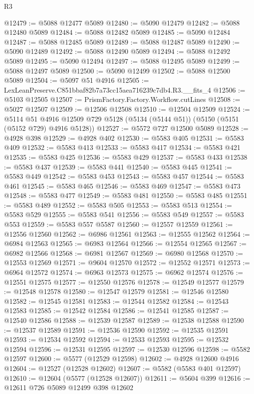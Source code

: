\begin{lexlean}{R3}
\begin{coremodule}
@12479 := @5088 @12477 @5089
@12480 := @5090 @12479
@12482 := @5088 @12480 @5089
@12484 := @5088 @12482 @5089
@12485 := @5090 @12484
@12487 := @5088 @12485 @5089
@12489 := @5088 @12487 @5089
@12490 := @5090 @12489
@12492 := @5088 @12490 @5089
@12494 := @5088 @12492 @5089
@12495 := @5090 @12494
@12497 := @5088 @12495 @5089
@12499 := @5088 @12497 @5089
@12500 := @5090 @12499
@12502 := @5088 @12500 @5089
@12504 := @5097 @51 @4916
@12505 := LexLeanPreserve.C851bbaf82b7a73cc15aea716239c7db4.R3.__fits_4
@12506 := @5103 @12505
@12507 := PrismFactory.Factory.Workflow.cutLines
@12508 := @5027 @12507
@12509 := @12506 @12508
@12510 := @12504 @12509
@12524 := @5114
    @51
    @4916
    @12509
    @729
    @5128
    (@5134 (@5144 @51))
    (@5150 (@5151 (@5152 @729) @4916 @5128))
@12527 := @5572 @727 @12500 @5089
@12528 := @4928 @398
@12529 := @4928 @402
@12530 := @5583 @405
@12531 := @5583 @409
@12532 := @5583 @413
@12533 := @5583 @417
@12534 := @5583 @421
@12535 := @5583 @425
@12536 := @5583 @429
@12537 := @5583 @433
@12538 := @5583 @437
@12539 := @5583 @441
@12540 := @5583 @445
@12541 := @5583 @449
@12542 := @5583 @453
@12543 := @5583 @457
@12544 := @5583 @461
@12545 := @5583 @465
@12546 := @5583 @469
@12547 := @5583 @473
@12548 := @5583 @477
@12549 := @5583 @481
@12550 := @5583 @485
@12551 := @5583 @489
@12552 := @5583 @505
@12553 := @5583 @513
@12554 := @5583 @529
@12555 := @5583 @541
@12556 := @5583 @549
@12557 := @5583 @553
@12559 := @5583 @557 @5587
@12560 := @12557 @12559
@12561 := @12556 @12560
@12562 := @6986 @12561
@12563 := @12555 @12562
@12564 := @6984 @12563
@12565 := @6983 @12564
@12566 := @12554 @12565
@12567 := @6982 @12566
@12568 := @6981 @12567
@12569 := @6980 @12568
@12570 := @12553 @12569
@12571 := @9604 @12570
@12572 := @12552 @12571
@12573 := @6964 @12572
@12574 := @6963 @12573
@12575 := @6962 @12574
@12576 := @12551 @12575
@12577 := @12550 @12576
@12578 := @12549 @12577
@12579 := @12548 @12578
@12580 := @12547 @12579
@12581 := @12546 @12580
@12582 := @12545 @12581
@12583 := @12544 @12582
@12584 := @12543 @12583
@12585 := @12542 @12584
@12586 := @12541 @12585
@12587 := @12540 @12586
@12588 := @12539 @12587
@12589 := @12538 @12588
@12590 := @12537 @12589
@12591 := @12536 @12590
@12592 := @12535 @12591
@12593 := @12534 @12592
@12594 := @12533 @12593
@12595 := @12532 @12594
@12596 := @12531 @12595
@12597 := @12530 @12596
@12598 := @5582 @12597
@12600 := @5577 (@12529 @12598)
@12602 := @4928 @12600 @4916
@12604 := @12527 (@12528 @12602)
@12607 := @5582 (@5583 @401 @12597)
@12610 := @12604 (@5577 (@12528 @12607))
@12611 := @5604 @399
@12616 := @12611 @726 @5089 @12499 @398 @12602

\end{coremodule}
\end{lexlean}
